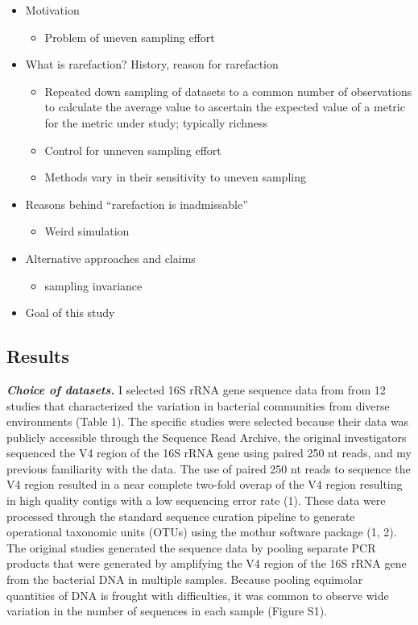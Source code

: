 \documentclass[
]{article}
\providecommand{\tightlist}{%
  \setlength{\itemsep}{0pt}\setlength{\parskip}{0pt}}
\begin{document}
\begin{itemize}
\tightlist
\item
  Motivation

  \begin{itemize}
  \tightlist
  \item
    Problem of uneven sampling effort
  \end{itemize}
\item
  What is rarefaction? History, reason for rarefaction

  \begin{itemize}
  \tightlist
  \item
    Repeated down sampling of datasets to a common number of
    observations to calculate the average value to ascertain the
    expected value of a metric for the metric under study; typically
    richness
  \item
    Control for unneven sampling effort
  \item
    Methods vary in their sensitivity to uneven sampling
  \end{itemize}
\item
  Reasons behind ``rarefaction is inadmissable''

  \begin{itemize}
  \tightlist
  \item
    Weird simulation
  \end{itemize}
\item
  Alternative approaches and claims

  \begin{itemize}
  \tightlist
  \item
    sampling invariance
  \end{itemize}
\item
  Goal of this study
\end{itemize}

\hypertarget{results}{%
\subsection{Results}\label{results}}

\textbf{\emph{Choice of datasets.}} I selected 16S rRNA gene sequence
data from from 12 studies that characterized the variation in bacterial
communities from diverse environments (Table 1). The specific studies
were selected because their data was publicly accessible through the
Sequence Read Archive, the original investigators sequenced the V4
region of the 16S rRNA gene using paired 250 nt reads, and my previous
familiarity with the data. The use of paired 250 nt reads to sequence
the V4 region resulted in a near complete two-fold overap of the V4
region resulting in high quality contigs with a low sequencing error
rate (1). These data were processed through the standard sequence
curation pipeline to generate operational taxonomic units (OTUs) using
the mothur software package (1, 2). The original studies generated the
sequence data by pooling separate PCR products that were generated by
amplifying the V4 region of the 16S rRNA gene from the bacterial DNA in
multiple samples. Because pooling equimolar quantities of DNA is frought
with difficulties, it was common to observe wide variation in the number
of sequences in each sample (Figure S1).
\end{document}
